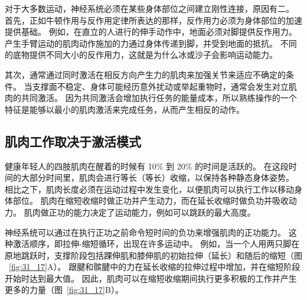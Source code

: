 对于大多数运动，神经系统必须在某些身体部位之间建立刚性连接，原因有二。
首先，正如牛顿作用与反作用定律所表达的那样，反作用力必须为身体部位的加速提供基础。
例如，在直立的人进行的伸手动作中，地面必须对脚提供反作用力。
产生手臂运动的肌肉动作施加的力通过身体传递到脚，并受到地面的抵抗。
不同的底物提供不同大小的反作用力，这就是为什么冰或沙子会影响运动能力。


其次，通常通过同时激活在相反方向产生力的肌肉来加强关节来适应不确定的条件。
当支撑面不稳定、身体可能经历意外扰动或举起重物时，通常会发生对立肌肉的共同激活。
因为共同激活会增加执行任务的能量成本，所以熟练操作的一个特征是能够以最小的肌肉激活来完成任务，从而产生相反的动作。



\subsection{肌肉工作取决于激活模式}

健康年轻人的四肢肌肉在醒着的时候有 10\% 到 20\% 的时间是活跃的。
在这段时间的大部分时间里，肌肉会进行等长（等长）收缩，以保持各种静态身体姿势。
相比之下，肌肉长度必须在运动过程中发生变化，以便肌肉可以执行工作以移动身体部位。
肌肉在缩短收缩时做正功并产生动力，而在延长收缩时做负功并吸收动力。
肌肉做正功的能力决定了运动能力，例如可以跳跃的最大高度。


神经系统可以通过在执行正功之前命令短时间的负功来增强肌肉的正功能力。
这种激活顺序，即拉伸-缩短循环，出现在许多运动中。 
例如，当一个人用两只脚在原地跳跃时，支撑阶段包括踝伸肌和膝伸肌的初始拉伸（延长）和随后的缩短（图 ~\ref{fig:31_17}A）。
跟腱和髌腱中的力在延长收缩的拉伸过程中增加，并在缩短阶段开始时达到最大值。
因此，肌肉可以在缩短收缩期间执行更多积极的工作并产生更多的力量（图~\ref{fig:31_17}B）。


